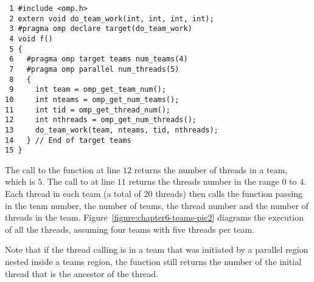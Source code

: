 \begin{figure*}[!tbh]
\begin{verbatim}
 1 #include <omp.h>
 2 extern void do_team_work(int, int, int, int);
 3 #pragma omp declare target(do_team_work)
 4 void f()
 5 {
 6   #pragma omp target teams num_teams(4)
 7   #pragma omp parallel num_threads(5)
 8   {
 9     int team = omp_get_team_num();
10     int nteams = omp_get_num_teams();
11     int tid = omp_get_thread_num();
12     int nthreads = omp_get_num_threads();
13     do_team_work(team, nteams, tid, nthreads);
14   } // End of target teams
15 }
\end{verbatim}
\caption{ \textbf {Example of a parallel construct nested in a 
                   target teams construct} -- \small
          Multiple teams of threads execute the function \texttt{do\_team\_work()}.     
         }
\label{figure:chapter6-teams-v2}
\end{figure*}

The call to the  function at line $12$ returns the
number of threads in a team, which is $5$. The call to 
at line $11$ returns the threads number in the range $0$ to $4$.
Each thread in each team (a total of 20 threads) then calls the function
 passing in the team number, the number of teams, the thread number and
the number of threads in the team.  Figure~\ref{figure:chapter6-teams-pic2} diagrams
the execution of all the threads, assuming four teams with five threads per
team.

Note that if the thread calling  is in a team that was
initiated by a parallel region nested inside a teams region, the function still
returns the number of the initial thread that is the ancestor of the thread.

\begin{figure*}[!tbh]
\centering
{}
\caption{ \textbf{The initial threads created by the teams construct each
               become the master of a new team of threads.  } -- \small
        Each initial thread starts execution as team of one thread.  The initial threads
        execute the teams region in parallel and immediately encounter
        a parallel construct.  Each initial thread then becomes the
        master of a new team of threads.
        }
\label{figure:chapter6-teams-pic2}
\end{figure*}

